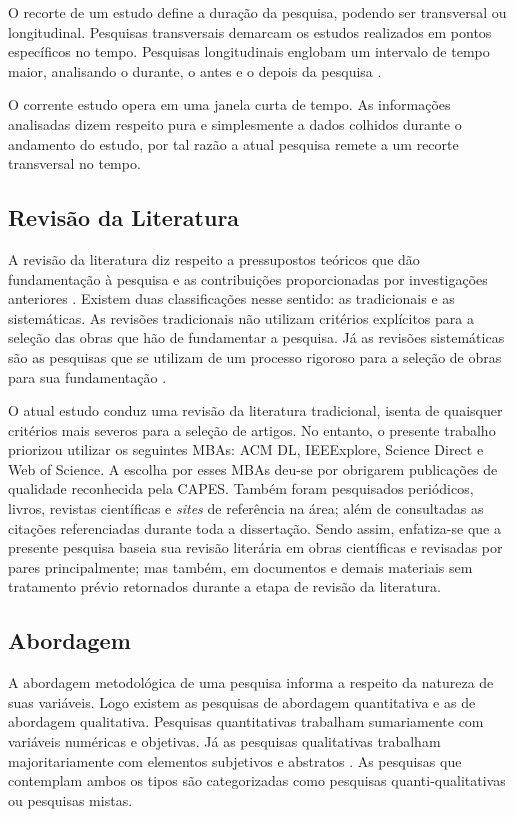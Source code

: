 O recorte de um estudo define a duração da pesquisa, podendo ser transversal ou longitudinal. Pesquisas transversais demarcam os estudos realizados em pontos específicos no tempo. Pesquisas longitudinais englobam um intervalo de tempo maior, analisando o durante, o antes e o depois da pesquisa \cite{hochman2005desenhos}. 

O corrente estudo opera em uma janela curta de tempo. As informações analisadas dizem respeito pura e simplesmente a dados colhidos durante o andamento do estudo, por tal razão a atual pesquisa remete a um recorte transversal no tempo. 

\subsection{Revisão da Literatura}\label{sub:Literatura}

A revisão da literatura diz respeito a pressupostos teóricos que dão fundamentação à pesquisa e as contribuições proporcionadas por investigações anteriores \cite{carlos2002elaborar}. Existem duas classificações nesse sentido: as tradicionais e as sistemáticas. As revisões tradicionais não utilizam critérios explícitos para a seleção das obras que hão de fundamentar a pesquisa. Já as revisões sistemáticas são as pesquisas que se utilizam de um processo rigoroso para a seleção de obras para sua fundamentação \cite{ferenhof2016desmistificando}.

O atual estudo conduz uma revisão da literatura tradicional, isenta de quaisquer critérios mais severos para a seleção de artigos. No entanto, o presente trabalho priorizou utilizar os seguintes \acfp{MBA}: ACM DL, IEEExplore, Science Direct e Web of Science. A escolha por esses \acp{MBA} deu-se por obrigarem publicações de qualidade reconhecida pela \ac{CAPES}. Também foram pesquisados periódicos, livros, revistas científicas e \textit{sites} de referência na área; além de consultadas as citações referenciadas durante toda a dissertação. Sendo assim, enfatiza-se que a presente pesquisa baseia sua revisão literária em obras científicas e revisadas por pares principalmente; mas também, em documentos e demais materiais sem tratamento prévio retornados durante a etapa de revisão da literatura. 

\subsection{Abordagem}\label{sub:Abordagem}

A abordagem metodológica de uma pesquisa informa a respeito da natureza de suas variáveis. Logo existem as pesquisas de abordagem quantitativa e as de abordagem qualitativa. Pesquisas quantitativas trabalham sumariamente com variáveis numéricas e objetivas. Já as pesquisas qualitativas trabalham majoritariamente com elementos subjetivos e abstratos \cite{carlos2002elaborar}. As pesquisas que contemplam ambos os tipos são categorizadas como pesquisas quanti-qualitativas ou pesquisas mistas. 

